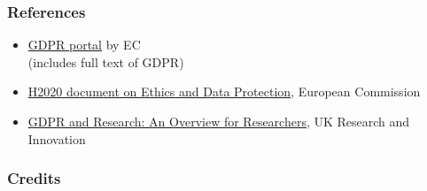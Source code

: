 \documentclass[17pt,aspectratio=169,hyperref={pdfusetitle,colorlinks,allcolors=olive}]{beamer}
\begin{document}
\begin{frame}[fragile]
  \frametitle{References}

  \begin{itemize}
  \item \href{https://gdpr.eu/}{GDPR portal} by EC \\
    (includes full text of GDPR)
  \item \href{https://ec.europa.eu/research/participants/data/ref/h2020/grants_manual/hi/ethics/h2020_hi_ethics-data-protection_en.pdf}{H2020 document on Ethics and Data Protection}, European Commission
  \item \href{https://www.ukri.org/files/about/policy/ukri-gdpr-faqs-pdf}{GDPR and Research: An Overview for Researchers}, UK Research and Innovation
  \end{itemize}
  
\end{frame}


\begin{frame}[fragile]
  \frametitle{Credits}

  
\end{frame}




\end{document}
